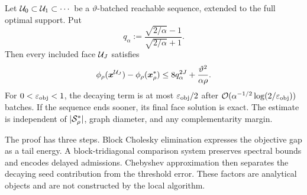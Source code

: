 \begin{theorem}
\label{thm:threshold-batch-depth}
Let $\mathcal{U}_0\subset \mathcal{U}_1\subset\cdots$ be a $\vartheta$-batched reachable
sequence, extended to the full optimal support.  Put
\begin{equation*}
 q_\alpha:=
 \frac{\sqrt{2/\alpha}-1}{\sqrt{2/\alpha}+1}.
\end{equation*}
Then every included face $\mathcal{U}_J$ satisfies
\begin{equation}
 \phi_\rho(\bm{x}^{\mathcal{U}_J})-\phi_\rho(\bm{x}_\rho^*)
 \leq8q_\alpha^{2J}+\frac{\vartheta^2}{\alpha\rho}.
 \label{eq:batch-depth-main}
\end{equation}
For $0<\varepsilon_{\mathrm{obj}}<1$, the decaying term is at most $\varepsilon_{\mathrm{obj}}/2$ after
$\mathcal{O}(\alpha^{-1/2}\log(2/\varepsilon_{\mathrm{obj}}))$ batches. If the sequence ends sooner,
its final face solution is exact. The estimate is independent of
$|\mathcal{S}_\rho^*|$, graph diameter, and any complementarity margin.
\end{theorem}

The proof has three steps. Block Cholesky elimination expresses the
objective gap as a tail energy. A block-tridiagonal comparison system
preserves spectral bounds and encodes delayed admissions. Chebyshev
approximation then separates the decaying seed contribution from the
threshold error. These factors are analytical objects and are not
constructed by the local algorithm.

